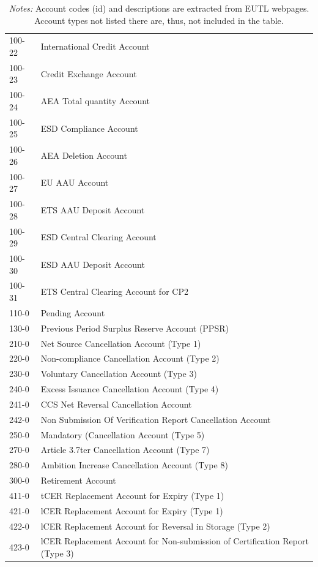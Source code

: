 \documentclass[authoryear]{elsarticle}
\begin{document}
\begin{table}[htbp]
\begin{tabular*}{\textwidth}{@{}@{\extracolsep{\fill}} ll @{}}
		100-22 & International Credit Account \\
		100-23 & Credit Exchange Account \\
		100-24 & AEA Total quantity Account \\
		100-25 & ESD Compliance Account \\
		100-26 & AEA Deletion Account \\
		100-27 & EU AAU Account \\
		100-28 & ETS AAU Deposit Account \\
		100-29 & ESD Central Clearing Account \\
		100-30 & ESD AAU Deposit Account \\
		100-31 & ETS Central Clearing Account for CP2 \\
		110-0 & Pending Account \\
		130-0 & Previous Period Surplus Reserve Account (PPSR) \\
		210-0 & Net Source Cancellation Account (Type 1) \\
		220-0 & Non-compliance Cancellation Account (Type 2) \\
		230-0 & Voluntary Cancellation Account (Type 3) \\
		240-0 & Excess Issuance Cancellation Account (Type 4) \\
		241-0 & CCS Net Reversal Cancellation Account \\
		242-0 & Non Submission Of Verification Report Cancellation Account \\
		250-0 & Mandatory (Cancellation Account (Type 5) \\
		270-0 & Article 3.7ter Cancellation Account (Type 7) \\
		280-0 & Ambition Increase Cancellation Account (Type 8) \\
		300-0 & Retirement Account \\
		411-0 & tCER Replacement Account for Expiry (Type 1) \\
		421-0 & lCER Replacement Account for Expiry (Type 1) \\
		422-0 & lCER Replacement Account for Reversal in Storage (Type 2) \\
		423-0 & lCER Replacement Account for Non-submission of Certification Report (Type 3) \\
		\bottomrule
		\bottomrule
	\end{tabular*}%
	\vspace{-3ex}
	\caption*{\footnotesize \emph{Notes:} Account codes (id) and descriptions are extracted from EUTL webpages. Account types not listed there are, thus, not included in the table.}
	\vspace{0ex}
\end{table}%
\end{document}
